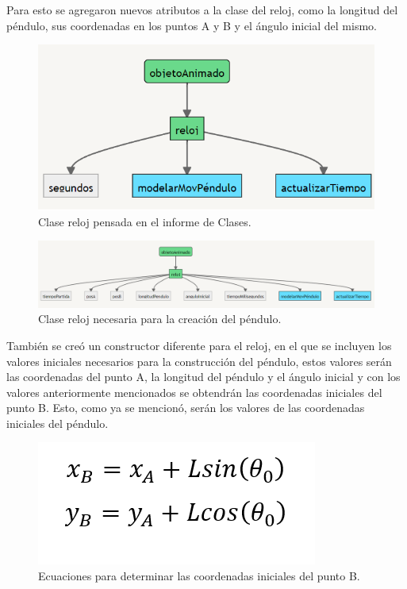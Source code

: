 \documentclass{article}
\begin{document}
Para esto se agregaron nuevos atributos a la clase del reloj, como la longitud del péndulo, sus coordenadas en los puntos A y B y el ángulo inicial del mismo.

\begin{figure}[h]
\includegraphics[scale=0.6]{Images/reloj.png}
\centering
\caption{Clase reloj pensada en el informe de Clases.}
\label{fig:reloj}
\end{figure}

\begin{figure}[h]
\includegraphics[scale=0.6]{Images/newreloj.png}
\centering
\caption{Clase reloj necesaria para la creación del péndulo.}
\label{fig:newreloj}
\end{figure}

También se creó un constructor diferente para el reloj, en el que se incluyen los valores iniciales necesarios para la construcción del péndulo, estos valores serán las coordenadas del punto A, la longitud del péndulo y el ángulo inicial y con los valores anteriormente mencionados se obtendrán las coordenadas iniciales del punto B. Esto, como ya se mencionó, serán los valores de las coordenadas iniciales del péndulo.

\begin{figure}[h]
\includegraphics[scale=1]{Images/ecuacion1.png}
\centering
\caption{Ecuaciones para determinar las coordenadas iniciales del punto B.}
\label{fig:ecu2}
\end{figure}
\end{document}
